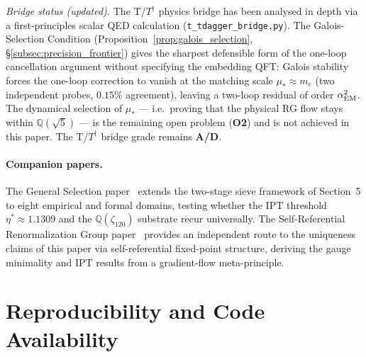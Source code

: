 \documentclass[11pt]{article}
\theoremstyle{remark}
\begin{document}
\medskip
\noindent\textit{Bridge status (updated).}
The T/$T^\dagger$ physics bridge has been analysed in depth via a first-principles
scalar QED calculation (\texttt{t\_tdagger\_bridge.py}).
The Galois-Selection Condition (Proposition~\ref{prop:galois_selection},
\S\ref{subsec:precision_frontier}) gives the sharpest defensible form of the
one-loop cancellation argument without specifying the embedding QFT:
Galois stability forces the one-loop correction to vanish at the matching scale
$\mu_* \approx m_e$ (two independent probes, $0.15\%$ agreement), leaving a
two-loop residual of order $\alpha_{\rm EM}^2$.
The dynamical selection of $\mu_*$ — i.e.\ proving that the physical RG flow
stays within $\mathbb{Q}(\sqrt{5})$ — is the remaining open problem (\textbf{O2})
and is not achieved in this paper.
The T/$T^\dagger$ bridge grade remains \textbf{A/D}.

\paragraph{Companion papers.}
The General Selection paper~\cite{SpivackGeneralSelection} extends the two-stage
sieve framework of Section~5 to eight empirical and formal domains, testing whether
the IPT threshold $\eta^*\approx 1.1309$ and the $\mathbb{Q}(\zeta_{120})$
substrate recur universally. The Self-Referential Renormalization Group
paper~\cite{SpivackSRRG} provides an independent route to the uniqueness claims
of this paper via self-referential fixed-point structure, deriving the gauge
minimality and IPT results from a gradient-flow meta-principle.


\section*{Reproducibility and Code Availability}
\end{document}

